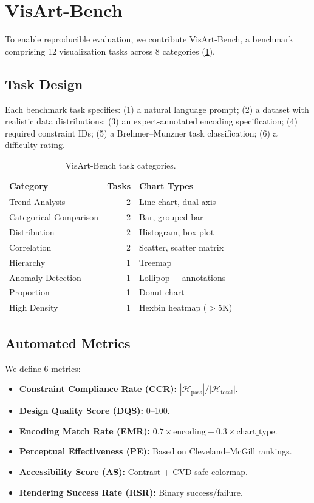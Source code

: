 \documentclass[final,5p,times,twocolumn]{elsarticle}
\begin{document}
\section{VisArt-Bench}
\label{sec:bench}

To enable reproducible evaluation, we contribute VisArt-Bench, a benchmark comprising 12 visualization tasks across 8 categories (\cref{tab:bench}).

\subsection{Task Design}

Each benchmark task specifies:
(1) a natural language prompt;
(2) a dataset with realistic data distributions;
(3) an expert-annotated encoding specification;
(4) required constraint IDs;
(5) a Brehmer--Munzner task classification;
(6) a difficulty rating.

\begin{table}[!t]
\centering
\caption{VisArt-Bench task categories.}
\label{tab:bench}
\small
\begin{tabular}{@{}lrl@{}}
\toprule
\textbf{Category} & \textbf{Tasks} & \textbf{Chart Types} \\
\midrule
Trend Analysis & 2 & Line chart, dual-axis \\
Categorical Comparison & 2 & Bar, grouped bar \\
Distribution & 2 & Histogram, box plot \\
Correlation & 2 & Scatter, scatter matrix \\
Hierarchy & 1 & Treemap \\
Anomaly Detection & 1 & Lollipop + annotations \\
Proportion & 1 & Donut chart \\
High Density & 1 & Hexbin heatmap ($>5$K) \\
\bottomrule
\end{tabular}
\end{table}

\subsection{Automated Metrics}

We define 6 metrics:

\begin{itemize}
  \item \textbf{Constraint Compliance Rate (CCR):} $|\mathcal{H}_\text{pass}| / |\mathcal{H}_\text{total}|$.
  \item \textbf{Design Quality Score (DQS):} 0--100.
  \item \textbf{Encoding Match Rate (EMR):} $0.7 \times \text{encoding} + 0.3 \times \text{chart\_type}$.
  \item \textbf{Perceptual Effectiveness (PE):} Based on Cleveland--McGill rankings.
  \item \textbf{Accessibility Score (AS):} Contrast + CVD-safe colormap.
  \item \textbf{Rendering Success Rate (RSR):} Binary success/failure.
\end{itemize}
\end{document}
